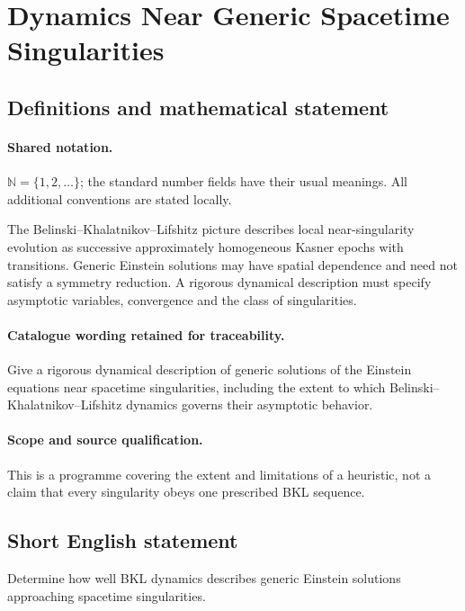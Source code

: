 \documentclass[11pt]{article}
\begin{document}
\section{Dynamics Near Generic Spacetime Singularities}\label{statement}

\subsection{Definitions and mathematical statement}

\paragraph{Shared notation.}$\mathbb N=\{1,2,\ldots\}$; the standard number fields have their usual meanings. All additional conventions are stated locally.


The Belinski--Khalatnikov--Lifshitz picture describes local near-singularity evolution as successive approximately homogeneous Kasner epochs with transitions. Generic Einstein solutions may have spatial dependence and need not satisfy a symmetry reduction. A rigorous dynamical description must specify asymptotic variables, convergence and the class of singularities.

\paragraph{Catalogue wording retained for traceability.}
Give a rigorous dynamical description of generic solutions of the Einstein equations near spacetime singularities, including the extent to which Belinski–Khalatnikov–Lifshitz dynamics governs their asymptotic behavior.

\paragraph{Scope and source qualification.}This is a programme covering the extent and limitations of a heuristic, not a claim that every singularity obeys one prescribed BKL sequence.
\subsection{Short English statement}
Determine how well BKL dynamics describes generic Einstein solutions approaching spacetime singularities.
\end{document}
